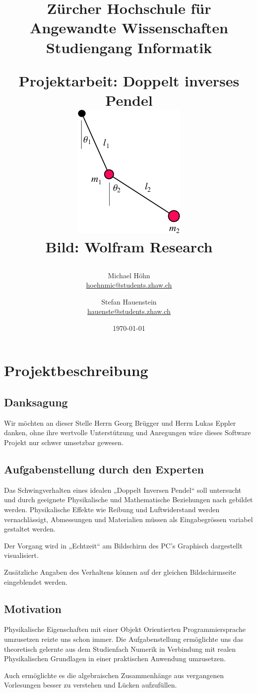 \documentclass[12pt]{article}
\title{\vspace{-1cm}\linespread{1}\begin{flushleft}\normalsize{Zürcher Hochschule für Angewandte Wissenschaften\\Studiengang Informatik\\}\end{flushleft}\vspace{2cm}\Large{Projektarbeit: Doppelt inverses Pendel}\\\vspace{2cm} \includegraphics[scale=1]{title.png} \\ \tiny{Bild: Wolfram Research}}
\author{Michael Höhn\\\href{mailto:hoehnmic@students.zhaw.ch}{hoehnmic@students.zhaw.ch} \and Stefan Hauenstein\\\href{mailto:hauenste@students.zhaw.ch}{hauenste@students.zhaw.ch}}
\date{\today}
\numberwithin{equation}{subsection}
\begin{document}
\maketitle\thispagestyle{empty}
\newpage

\tableofcontents
\newpage

\section{Projektbeschreibung}
\subsection{Danksagung}
Wir möchten an dieser Stelle Herrn Georg Brügger und Herrn Lukas Eppler danken, ohne ihre wertvolle Unterstützung und Anregungen wäre dieses Software Projekt nur schwer umsetzbar gewesen.

\subsection{Aufgabenstellung durch den Experten}
Das Schwingverhalten eines idealen „Doppelt Inversen Pendel“ soll untersucht und durch geeignete Physikalische und Mathematische Beziehungen nach gebildet werden. Physikalische Effekte wie Reibung und Luftwiderstand werden vernachlässigt, Abmessungen und Materialien müssen als Eingabegrössen variabel gestaltet werden.

Der Vorgang wird in „Echtzeit“ am Bildschirm des PC's Graphisch dargestellt visualisiert.

Zusätzliche Angaben des Verhaltens können auf der gleichen Bildschirmseite eingeblendet werden.

\subsection{Motivation}
Physikalische Eigenschaften mit einer Objekt Orientierten Programmiersprache umzusetzen reizte uns schon immer. Die  Aufgabenstellung ermöglichte uns das theoretisch gelernte aus dem Studienfach Numerik in Verbindung mit realen Physikalischen Grundlagen in einer praktischen Anwendung umzusetzen.

Auch ermöglichte es die algebraischen Zusammenhänge aus vergangenen Vorlesungen besser zu verstehen und Lücken aufzufüllen.
\end{document}

